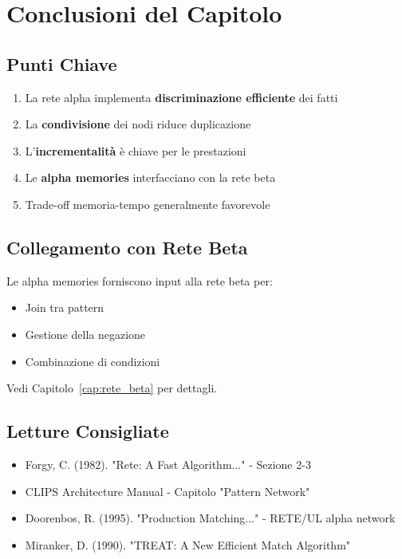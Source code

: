 \section{Conclusioni del Capitolo}

\subsection{Punti Chiave}

\begin{enumerate}
\item La rete alpha implementa \textbf{discriminazione efficiente} dei fatti
\item La \textbf{condivisione} dei nodi riduce duplicazione
\item L'\textbf{incrementalità} è chiave per le prestazioni
\item Le \textbf{alpha memories} interfacciano con la rete beta
\item Trade-off memoria-tempo generalmente favorevole
\end{enumerate}

\subsection{Collegamento con Rete Beta}

Le alpha memories forniscono input alla rete beta per:
\begin{itemize}
\item Join tra pattern
\item Gestione della negazione
\item Combinazione di condizioni
\end{itemize}

Vedi Capitolo~\ref{cap:rete_beta} per dettagli.

\subsection{Letture Consigliate}

\begin{itemize}
\item Forgy, C. (1982). "Rete: A Fast Algorithm..." - Sezione 2-3
\item CLIPS Architecture Manual - Capitolo "Pattern Network"
\item Doorenbos, R. (1995). "Production Matching..." - RETE/UL alpha network
\item Miranker, D. (1990). "TREAT: A New Efficient Match Algorithm"
\end{itemize}

